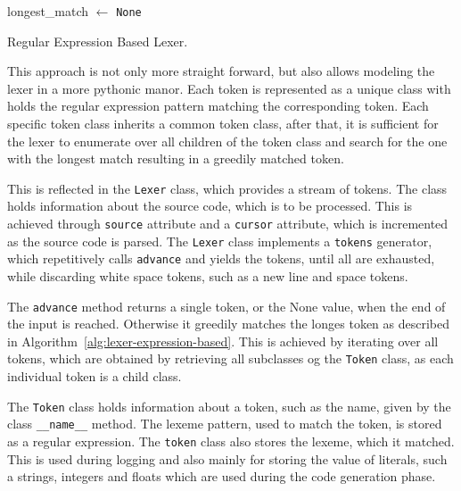 \begingroup
\vspace{1.5em}
\begin{algorithm}[H]
\setlength{\algomargin}{1.5em}
longest\_match $\gets$ \texttt{None}\\


    


\caption{Regular Expression Based Lexer.}
\label{alg:lexer-expression-based}
\end{algorithm}
\vspace{1.5em}
\endgroup

This approach is not only more straight forward, but also allows modeling the lexer in a more pythonic manor. Each token is represented as a unique class with holds the regular expression pattern matching the corresponding token. Each specific token class inherits a common token class, after that, it is sufficient for the lexer to enumerate over all children of the token class and search for the one with the longest match resulting in a greedily matched token.


This is reflected in the \texttt{Lexer} class, which provides a stream of tokens. The class holds information about the source code, which is to be processed. This is achieved through \texttt{source} attribute and a \texttt{cursor} attribute, which is incremented as the source code is parsed. The \texttt{Lexer} class implements a \texttt{tokens} generator, which repetitively calls \texttt{advance} and yields the tokens, until all are exhausted, while discarding white space tokens, such as a new line and space tokens. 

The \texttt{advance} method returns a single token, or the None value, when the end of the input is reached. Otherwise it greedily matches the longes token as described in Algorithm~\ref{alg:lexer-expression-based}. This is achieved by iterating over all tokens, which are obtained by retrieving all subclasses og the \texttt{Token} class, as each individual token is a child class.

The \texttt{Token} class holds information about a token, such as the name, given by the class \texttt{\_\_name\_\_} method. The lexeme pattern, used to match the token, is stored as a regular expression. The \texttt{token} class also stores the lexeme, which it matched. This is used during logging and also mainly for storing the value of literals, such a strings, integers and floats which are used during the code generation phase.


